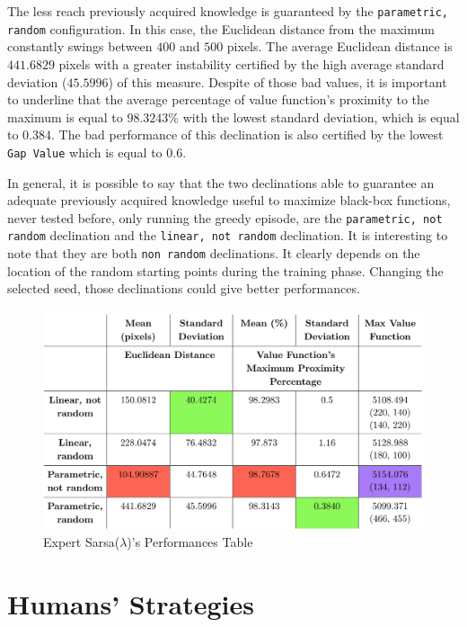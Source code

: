 The less reach previously acquired knowledge is guaranteed by the {\tt parametric, random} configuration. In this case, the Euclidean distance from the maximum constantly swings between $400$ and $500$ pixels. The average Euclidean distance is $441.6829$ pixels with a greater instability certified by the high average standard deviation ($45.5996$) of this measure. Despite of those bad values, it is important to underline that the average percentage of value function's proximity to the maximum is equal to $98.3243\%$ with the lowest standard deviation, which is equal to $0.384$. The bad performance of this declination is also certified by the lowest {\tt Gap Value} which is equal to $0.6$.

In general, it is possible to say that the two declinations able to guarantee an adequate previously acquired knowledge useful to maximize black-box functions, never tested before, only running the greedy episode, are the {\tt parametric, not random} declination and the {\tt linear, not random} declination. It is interesting to note that they are both {\tt non random} declinations. It clearly depends on the location of the random starting points during the training phase. Changing the selected seed, those declinations could give better performances.

\begin{figure}
	\centering
	\includegraphics[width=\linewidth]{IMAGES/ExpertReasumingTable}
	\caption{Expert Sarsa($\lambda$)'s Performances Table}
	\label{fig:expertreasumingtable}
\end{figure}

\section{Humans' Strategies}

